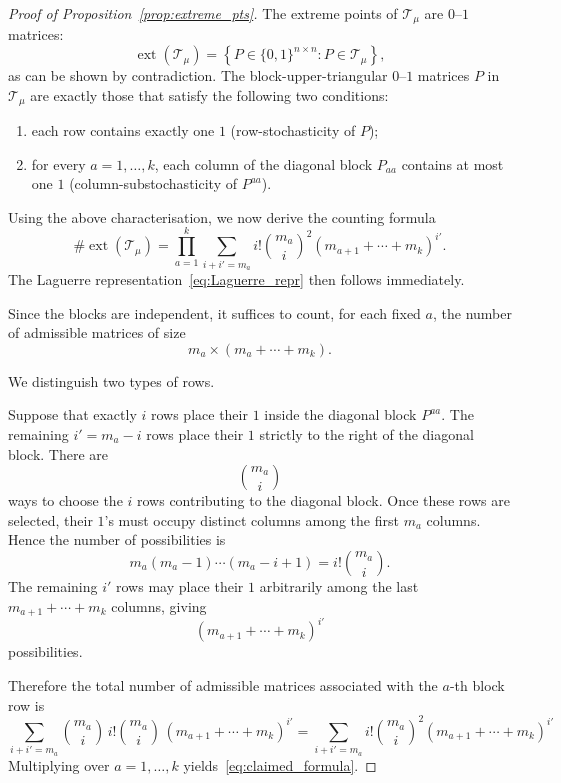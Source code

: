 \documentclass[11pt,a4paper,longbibliography]{amsart}
\numberwithin{equation}{section}
\theoremstyle{plain}
\theoremstyle{definition}
\theoremstyle{remark}
\begin{document}
			
			
			\begin{proof}[Proof of Proposition~\ref{prop:extreme_pts}] The extreme points of $\mathcal{T}_{\mu}$ are $0$--$1$ matrices:
				\begin{equation}
					\operatorname{ext}\left(\mathcal{T}_{\mu}\right)=\left\{P\in\{0,1\}^{n\times n}\colon P\in \mathcal{T}_{\mu}\right\},
				\end{equation}
				as can be shown by contradiction.
				The block-upper-triangular $0$--$1$ matrices $P$  in $\mathcal{T}_{\mu}$ are exactly those that satisfy the following two conditions:
				\begin{enumerate}
					\item each row contains exactly one $1$ (row-stochasticity of $P$);
					\item for every $a=1,\ldots,k$, each column of the diagonal block $P_{aa}$ contains at most one $1$ (column-substochasticity of $P^{aa}$).
				\end{enumerate}
				
				Using the above characterisation, we now  derive the counting formula
				\begin{equation}
					\label{eq:claimed_formula}
					\#\operatorname{ext}\left(\mathcal{T}_{\mu}\right)=\prod_{a=1}^k
					\sum_{i+i'=m_a}
					i!\binom{m_a}{i}^2
					\left(m_{a+1}+\cdots+m_k\right)^{i'}.
				\end{equation}
				The Laguerre representation~\eqref{eq:Laguerre_repr} then follows immediately.
				
				Since the blocks are independent, it suffices to count, for each fixed $a$, the number of admissible matrices of size
				$$
				m_a\times (m_a+\cdots+m_k).
				$$
				
				We distinguish two types of rows.
				
				Suppose that exactly $i$ rows place their $1$ inside the diagonal block $P^{aa}$. The remaining $
				i'=m_a-i$
				rows place their $1$ strictly to the right of the diagonal block.
				There are
				$$
				\binom{m_a}{i}
				$$
				ways to choose the $i$ rows contributing to the diagonal block. Once these rows are selected, their $1$'s must occupy distinct columns among the first $m_a$ columns. Hence the number of possibilities is
				$$
				m_a(m_a-1)\cdots(m_a-i+1)
				=
				i!\binom{m_a}{i}.
				$$
				The remaining $i'$ rows may place their $1$ arbitrarily among the last
				$m_{a+1}+\cdots+m_k$
				columns, giving
				$$
				\left(m_{a+1}+\cdots+m_k\right)^{i'}
				$$
				possibilities.
				
				Therefore the total number of admissible matrices associated with the $a$-th block row is
				$$
				\sum_{i+i'=m_a}
				\binom{m_a}{i}
				\,i!\binom{m_a}{i}\,
				\left(m_{a+1}+\cdots+m_k\right)^{i'}=\sum_{i+i'=m_a}
				i!\binom{m_a}{i}^2
				\left(m_{a+1}+\cdots+m_k\right)^{i'}
				$$
				Multiplying over $a=1,\ldots,k$
				yields~\eqref{eq:claimed_formula}.
			\end{proof}
			
\end{document}
